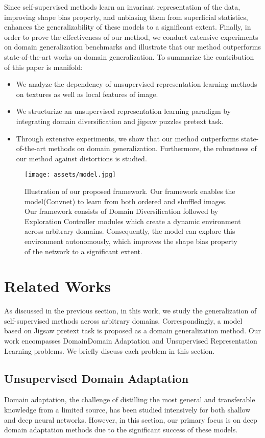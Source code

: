 \documentclass[10pt,twocolumn,letterpaper]{article}
\begin{document}
Since self-supervised methods learn an invariant representation of the data, improving shape bias property, and unbiasing them from superficial statistics, enhances the generalizability of these models to a significant extent. Finally, in order to prove the effectiveness of our method, we conduct extensive experiments on domain generalization benchmarks and illustrate that our method outperforms state-of-the-art works on domain generalization.
To summarize the contribution of this paper is manifold:
\begin{itemize}
	\item We analyze the dependency of unsupervised representation learning methods on textures as well as local features of image. 
	\item We structurize an unsupervised representation learning paradigm by integrating domain diversification and jigsaw puzzles pretext task.
	\item Through extensive experiments, we show that our method outperforms state-of-the-art methods on domain generalization. Furthermore, the robustness of our method against distortions is studied.
\end{itemize}

\begin{figure*}[h!]
	\begin{center}
		\texttt{[image: assets/model.jpg]}
	\end{center}
	\caption{Illustration of our proposed framework. Our framework enables the model(Convnet) to learn from both ordered and shuffled images. Our framework consists of Domain Diversification followed by Exploration Controller modules which create a dynamic environment across arbitrary domains. Consequently, the model can explore this environment autonomously, which improves the shape bias property of the network to a significant extent.}\label{figure2}
\end{figure*}
 \section{Related Works}
As discussed in the previous section, in this work, we study the generalization of self-supervised methods across arbitrary domains. Correspondingly, a model based on Jigsaw pretext task is proposed as a domain generalization method. Our work encompasses DomainDomain Adaptation and Unsupervised Representation Learning problems. We briefly discuss each problem in this section.
\subsection{Unsupervised Domain Adaptation}
Domain adaptation, the challenge of distilling the most general and transferable knowledge from a limited source, has been studied intensively for both shallow and deep neural networks. However, in this section, our primary focus is on deep domain adaptation methods due to the significant success of these models\cite{jing2019self}.
\end{document}
